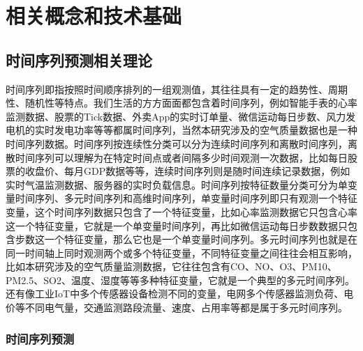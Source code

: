 \chapter{相关概念和技术基础}\label{ch:2}

\section{时间序列预测相关理论}

时间序列即指按照时间顺序排列的一组观测值，其往往具有一定的趋势性、周期性、随机性等特点。我们生活的方方面面都包含着时间序列，例如智能手表的心率监测数据、股票的Tick数据、外卖App的实时订单量、微信运动每日步数、风力发电机的实时发电功率等等都属时间序列，当然本研究涉及的空气质量数据也是一种时间序列数据。时间序列按连续性分类可以分为连续时间序列和离散时间序列，离散时间序列可以理解为在特定时间点或者间隔多少时间观测一次数据，比如每日股票的收盘价、每月GDP数据等等，连续时间序列则是随时间连续记录数据，例如实时气温监测数据、服务器的实时负载信息。时间序列按特征数量分类可分为单变量时间序列、多元时间序列和高维时间序列，单变量时间序列即只有观测一个特征变量，这个时间序列数据只包含了一个特征变量，比如心率监测数据它只包含心率这一个特征变量，它就是一个单变量时间序列，再比如微信运动每日步数数据只包含步数这一个特征变量，那么它也是一个单变量时间序列。多元时间序列也就是在同一时间轴上同时观测两个或多个特征变量，不同特征变量之间往往会相互影响，比如本研究涉及的空气质量监测数据，它往往包含有CO、NO、O3、PM10、PM2.5、SO2、温度、湿度等等多种特征变量，它就是一个典型的多元时间序列。还有像工业IoT中多个传感器设备检测不同的变量，电网多个传感器监测负荷、电价等不同电气量，交通监测路段流量、速度、占用率等都是属于多元时间序列。

\subsection{时间序列预测}

